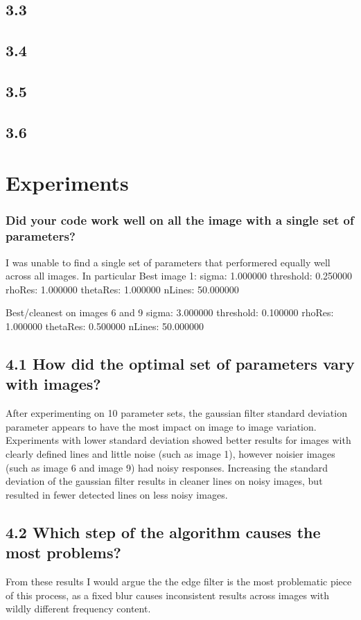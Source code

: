 \documentclass[12pt]{article}
\begin{document}
\subsection{3.3}
\subsection{3.4}
\subsection{3.5}
\subsection{3.6}

\section{Experiments}
\subsubsection{Did your code work well on all the image with a single set of parameters? }

I was unable to find a single set of parameters that performered equally well across all images. In particular
Best image 1:
sigma: 1.000000
threshold: 0.250000
rhoRes: 1.000000
thetaRes: 1.000000
nLines: 50.000000

Best/cleanest on images 6 and 9
sigma: 3.000000
threshold: 0.100000
rhoRes: 1.000000
thetaRes: 0.500000
nLines: 50.000000

\subsection{4.1 How did the optimal set of parameters vary with images? }
After experimenting on 10 parameter sets, the gaussian filter standard deviation parameter appears to have the most impact on image to image variation. Experiments with lower standard deviation showed better results for images with clearly defined lines and little noise (such as image 1), however noisier images (such as image 6 and image 9) had noisy responses.
Increasing the standard deviation of the gaussian filter results in cleaner lines on noisy images, but resulted in fewer detected lines on less noisy images.

\subsection{4.2 Which step of the algorithm causes the most problems? }
From these results I would argue the the edge filter is the most problematic piece of this process, as a fixed blur causes inconsistent results across images with wildly different frequency content.
\end{document}
